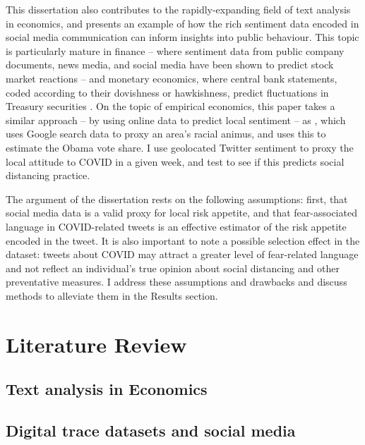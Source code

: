 \documentclass{article}
\begin{document}

This dissertation also contributes to the rapidly-expanding field of text analysis in economics, and presents an example of how the rich sentiment data encoded in social media communication can inform insights into public behaviour. This topic is particularly mature in finance -- where sentiment data from public company documents, news media, and social media have been shown to predict stock market reactions \parencite{bollenTwitterMoodPredicts2011} -- and monetary economics, where central bank statements, coded according to their dovishness or hawkishness, predict fluctuations in Treasury securities \parencite{luccaMeasuringCentralBank2009,gentzkowTextData2019}. On the topic of empirical economics, this paper takes a similar approach -- by using online data to predict local sentiment -- as \textcite{stephens-davidowitzCostRacialAnimus2014}, which uses Google search data to proxy an area's racial animus, and uses this to estimate the Obama vote share. I use geolocated Twitter sentiment to proxy the local attitude to COVID in a given week, and test to see if this predicts social distancing practice. 

The argument of the dissertation rests on the following assumptions: first, that social media data is a valid proxy for local risk appetite, and that fear-associated language in COVID-related tweets is an effective estimator of the risk appetite encoded in the tweet. It is also important to note a possible selection effect in the dataset: tweets about COVID may attract a greater level of fear-related language and not reflect an individual's true opinion about social distancing and other preventative measures. I address these assumptions and drawbacks and discuss methods to alleviate them in the Results section.


\section{Literature Review}%
\subsection{Text analysis in Economics}
\subsection{Digital trace datasets and social media}
\end{document}
